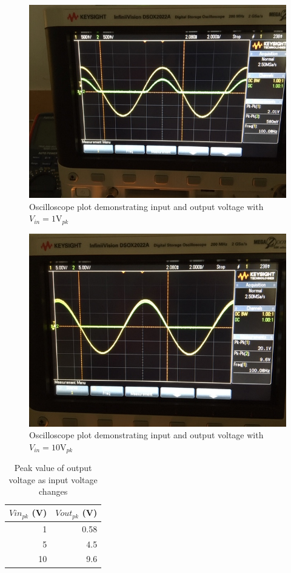 \documentclass{article}
\begin{document}
\begin{figure}[H]
  \centering
  \includegraphics[width=\textwidth]{image/Part1/IMG_3694.JPG}
  \caption{Oscilloscope plot demonstrating input and output voltage with $V_{in}=1\text{V}_{pk}$}
\end{figure}\begin{figure}[H]
  \centering
  \includegraphics[width=\textwidth]{image/Part1/IMG_3696.JPG}
  \caption{Oscilloscope plot demonstrating input and output voltage with $V_{in}=10\text{V}_{pk}$}
\end{figure}

\begin{table}[H]
  \centering
    \begin{tabular}{rr}
      \toprule
    \multicolumn{1}{l}{$Vin_{pk}$ (V)} & \multicolumn{1}{l}{$Vout_{pk}$ (V)} \\
    \midrule
    1     & 0.58 \\
    5     & 4.5 \\
    10    & 9.6 \\
      \bottomrule
  \end{tabular}%
    \caption{Peak value of output voltage as input voltage changes}
\end{table}%
\end{document}

